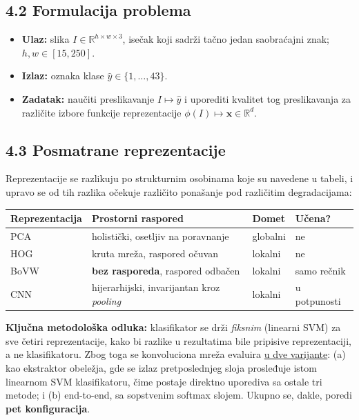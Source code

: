\documentclass[11pt,a4paper]{article}
\newcommand{\mvp}[1]{{\setulcolor{ForestGreen}\ul{#1}}}
\begin{document}
\subsection*{4.2 Formulacija problema}

\begin{itemize}
  \item \textbf{Ulaz:} slika $I \in \mathbb{R}^{h \times w \times 3}$, isečak koji sadrži tačno jedan saobraćajni znak; $h, w \in [15, 250]$.
  \item \textbf{Izlaz:} oznaka klase $\hat{y} \in \{1, \dots, 43\}$.
  \item \textbf{Zadatak:} naučiti preslikavanje $I \mapsto \hat{y}$ i uporediti kvalitet tog preslikavanja za različite izbore funkcije reprezentacije $\phi(I) \mapsto \mathbf{x} \in \mathbb{R}^d$.
\end{itemize}

\subsection*{4.3 Posmatrane reprezentacije}

Reprezentacije se razlikuju po strukturnim osobinama koje su navedene u tabeli, i upravo se od tih razlika očekuje različito ponašanje pod različitim degradacijama:

\begin{center}
\begin{tabular}{|l|l|l|l|}
\hline
\textbf{Reprezentacija} & \textbf{Prostorni raspored} & \textbf{Domet} & \textbf{Učena?} \\
\hline
PCA & holistički, osetljiv na poravnanje & globalni & ne \\
\hline
HOG & kruta mreža, raspored očuvan & lokalni & ne \\
\hline
BoVW & \textbf{bez rasporeda}, raspored odbačen & lokalni & samo rečnik \\
\hline
CNN & hijerarhijski, invarijantan kroz \textit{pooling} & lokalni & u potpunosti \\
\hline
\end{tabular}
\end{center}

\textbf{Ključna metodološka odluka:} klasifikator se drži \emph{fiksnim} (linearni SVM) za sve četiri reprezentacije, kako bi razlike u rezultatima bile pripisive reprezentaciji, a ne klasifikatoru. Zbog toga se konvoluciona mreža evaluira \mvp{u dve varijante}: (a) kao ekstraktor obeležja, gde se izlaz pretposlednjeg sloja prosleđuje istom linearnom SVM klasifikatoru, čime postaje direktno uporediva sa ostale tri metode; i (b) end-to-end, sa sopstvenim softmax slojem. Ukupno se, dakle, poredi \textbf{pet konfiguracija}.
\end{document}
